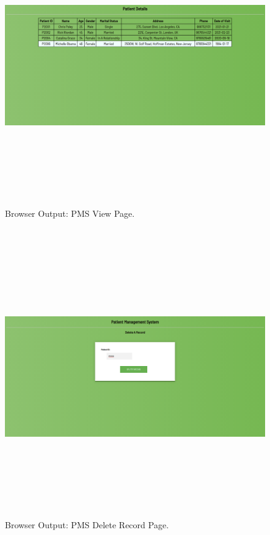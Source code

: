 \documentclass[12pt, a4]{article}
\begin{document}
\newpage
\subsection*{}
\begin{figure}[h]
\centering
\caption{Browser Output: PMS View Page.}
\includegraphics[height=12cm, width=16cm]{Output/PMSView2.png}
\end{figure}

\newpage
\subsection*{}
\begin{figure}[h]
\centering
\caption{Browser Output: PMS Delete Record Page.}
\includegraphics[height=12cm, width=16cm]{Output/PMSDelete.png}
\end{figure}
\end{document}
